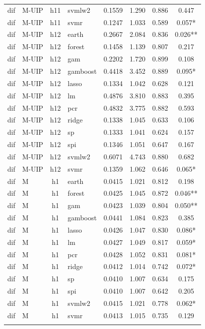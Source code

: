 \begin{ThreePartTable}
\begin{longtable}[t]{llclcccc}
dif & M-UIP & h11 & svmlw2 & 0.1559 & 1.290 & 0.886 & 0.447\\
dif & M-UIP & h11 & svmr & 0.1247 & 1.033 & 0.589 & 0.057*\\
\addlinespace
dif & M-UIP & h12 & earth & 0.2667 & 2.084 & 0.836 & 0.026**\\
dif & M-UIP & h12 & forest & 0.1458 & 1.139 & 0.807 & 0.217\\
dif & M-UIP & h12 & gam & 0.2202 & 1.720 & 0.899 & 0.108\\
dif & M-UIP & h12 & gamboost & 0.4418 & 3.452 & 0.889 & 0.095*\\
dif & M-UIP & h12 & lasso & 0.1334 & 1.042 & 0.628 & 0.121\\
dif & M-UIP & h12 & lm & 0.4876 & 3.810 & 0.883 & 0.395\\
dif & M-UIP & h12 & pcr & 0.4832 & 3.775 & 0.882 & 0.593\\
dif & M-UIP & h12 & ridge & 0.1338 & 1.045 & 0.633 & 0.106\\
dif & M-UIP & h12 & sp & 0.1333 & 1.041 & 0.624 & 0.157\\
dif & M-UIP & h12 & spi & 0.1346 & 1.051 & 0.647 & 0.167\\
dif & M-UIP & h12 & svmlw2 & 0.6071 & 4.743 & 0.880 & 0.682\\
dif & M-UIP & h12 & svmr & 0.1359 & 1.062 & 0.646 & 0.065*\\
\addlinespace
dif & M & h1 & earth & 0.0415 & 1.021 & 0.812 & 0.198\\
dif & M & h1 & forest & 0.0425 & 1.045 & 0.872 & 0.046**\\
dif & M & h1 & gam & 0.0423 & 1.039 & 0.804 & 0.050**\\
dif & M & h1 & gamboost & 0.0441 & 1.084 & 0.823 & 0.385\\
dif & M & h1 & lasso & 0.0426 & 1.047 & 0.830 & 0.086*\\
dif & M & h1 & lm & 0.0427 & 1.049 & 0.817 & 0.059*\\
dif & M & h1 & pcr & 0.0428 & 1.052 & 0.831 & 0.081*\\
dif & M & h1 & ridge & 0.0412 & 1.014 & 0.742 & 0.072*\\
dif & M & h1 & sp & 0.0410 & 1.007 & 0.634 & 0.175\\
dif & M & h1 & spi & 0.0410 & 1.007 & 0.642 & 0.205\\
dif & M & h1 & svmlw2 & 0.0415 & 1.021 & 0.778 & 0.062*\\
dif & M & h1 & svmr & 0.0413 & 1.015 & 0.735 & 0.129\\
\addlinespace

\end{longtable}
\end{ThreePartTable}
